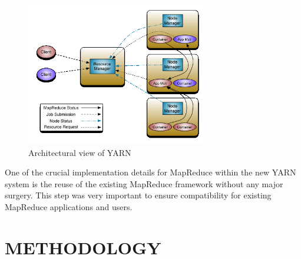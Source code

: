 \documentclass[a4paper,12pt,oneside]{report}
\begin{document}
\begin{enumerate}
                \begin{figure}[h!]
                        \centering
                        \includegraphics[width=80mm]{yarn}
                        \caption{Architectural view of YARN}
                \end{figure}

                One of the crucial implementation details for MapReduce within the new YARN system is the
                reuse of the existing MapReduce framework without any major surgery. This step was very
                important to ensure compatibility for existing MapReduce applications and users. 

\end{enumerate}

\newpage
\section{METHODOLOGY}
\end{document}
